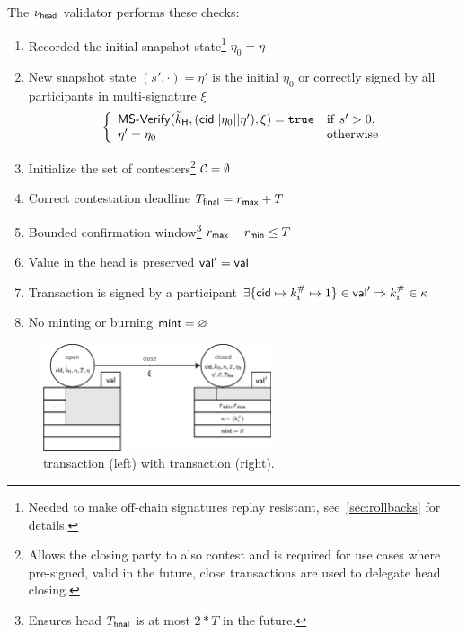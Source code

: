 \begin{samepage}
	\noindent The $\nu_\mathsf{head}$ validator performs these checks:
	\begin{enumerate}
		\item Recorded the initial snapshot state\footnote{Needed to make off-chain signatures replay resistant, see~\ref{sec:rollbacks} for details.} $\eta_0 = \eta$
		\item New snapshot state $(s', \cdot) = \eta'$ is the initial $\eta_{0}$
		      or correctly signed by all participants in multi-signature $\xi$ \\
		      \[
			      \left\{\begin{array}{ll}
				      \mathsf{MS\textsf{-}{}Verify}(\tilde{k}_{\mathsf{H}},(\mathsf{cid} || \eta_{0} || \eta'),\xi) = \mathtt{true} & \mathrm{if} ~ s' > 0, \\
				      \eta' = \eta_{0}                                              & \mathrm{otherwise}
			      \end{array}\right.
		      \]
		\item Initialize the set of contesters\footnote{Allows the closing party
			      to also contest and is required for use cases where pre-signed, valid in
			      the future, close transactions are used to delegate head closing.}
		      $\mathcal{C} = \emptyset$
		\item Correct contestation deadline $T_{\mathsf{final}} = r_{\mathsf{max}} + T$ 
		\item Bounded confirmation window\footnote{Ensures head $T_{\mathsf{final}}$ is at most
			      $2*T$ in the future.} $r_{\mathsf{max}} - r_{\mathsf{min}} \leq T$
		\item Value in the head is preserved $\mathsf{val}' = \mathsf{val}$
		\item Transaction is signed by a participant $\exists \{\mathsf{cid} \mapsto k^{\#}_{i} \mapsto 1\} \in \mathsf{val}' \Rightarrow k^{\#}_{i} \in \kappa$
		\item No minting or burning $\mathsf{mint} = \varnothing$
	\end{enumerate}
\end{samepage}

\begin{figure}[h]
	\centering
	\includegraphics[width=0.6\textwidth]{figures/SM-close.pdf}
	\caption{\mtxCCom{} transaction (left) with \mtxClose{} transaction
		(right).}\label{fig:SM-close}
\end{figure}


